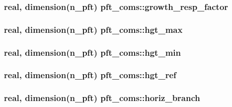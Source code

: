 \subsubsection[{\texorpdfstring{growth\+\_\+resp\+\_\+factor}{growth_resp_factor}}]{\setlength{\rightskip}{0pt plus 5cm}real, dimension(n\+\_\+pft) pft\+\_\+coms\+::growth\+\_\+resp\+\_\+factor}\hypertarget{namespacepft__coms_ae299a7616ce4a71415041f39e6e55d6c}{}\label{namespacepft__coms_ae299a7616ce4a71415041f39e6e55d6c}
\subsubsection[{\texorpdfstring{hgt\+\_\+max}{hgt_max}}]{\setlength{\rightskip}{0pt plus 5cm}real, dimension(n\+\_\+pft) pft\+\_\+coms\+::hgt\+\_\+max}\hypertarget{namespacepft__coms_a81703797d07f20bd129277ed6a78e30e}{}\label{namespacepft__coms_a81703797d07f20bd129277ed6a78e30e}
\subsubsection[{\texorpdfstring{hgt\+\_\+min}{hgt_min}}]{\setlength{\rightskip}{0pt plus 5cm}real, dimension(n\+\_\+pft) pft\+\_\+coms\+::hgt\+\_\+min}\hypertarget{namespacepft__coms_aab740dc3cca80fdd00440b412f111a74}{}\label{namespacepft__coms_aab740dc3cca80fdd00440b412f111a74}
\subsubsection[{\texorpdfstring{hgt\+\_\+ref}{hgt_ref}}]{\setlength{\rightskip}{0pt plus 5cm}real, dimension(n\+\_\+pft) pft\+\_\+coms\+::hgt\+\_\+ref}\hypertarget{namespacepft__coms_a8cc0c7c9a26d749fd17c1ddc8633ea8a}{}\label{namespacepft__coms_a8cc0c7c9a26d749fd17c1ddc8633ea8a}
\subsubsection[{\texorpdfstring{horiz\+\_\+branch}{horiz_branch}}]{\setlength{\rightskip}{0pt plus 5cm}real, dimension(n\+\_\+pft) pft\+\_\+coms\+::horiz\+\_\+branch}\hypertarget{namespacepft__coms_a8727392237e76b0ac668b40267b5db14}{}\label{namespacepft__coms_a8727392237e76b0ac668b40267b5db14}

